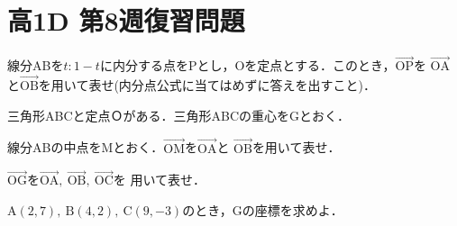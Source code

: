 \documentclass[b5paper, uplatex]{jsarticle}
\newcommand{\Vector}[1]{\overrightarrow{\text{#1}}}
\begin{document}
\section*{高1D 第8週復習問題}
\begin{enumarabicp}
  \item 線分ABを$t:1-t$に内分する点をPとし，Oを定点とする．このとき，$\overrightarrow{\text{OP}}$を
  $\overrightarrow{\text{OA}}$と$\overrightarrow{\text{OB}}$を用いて表せ(内分点公式に当てはめずに答えを出すこと)．
  \item 三角形ABCと定点Ｏがある．三角形ABCの重心をGとおく．
  \begin{enumromanp}
    \item 線分ABの中点をMとおく．$\overrightarrow{\text{OM}}$を$\overrightarrow{\text{OA}}$と
    $\Vector{OB}$を用いて表せ．
    \item $\Vector{OG}$を$\Vector{OA},\ \Vector{OB},\ \Vector{OC}$を
    用いて表せ．
    \item $\text{A}(2,7),\ \text{B}(4,2),\ \text{C}(9,-3)$のとき，Gの座標を求めよ．
  \end{enumromanp}
\end{enumarabicp}
\end{document}
